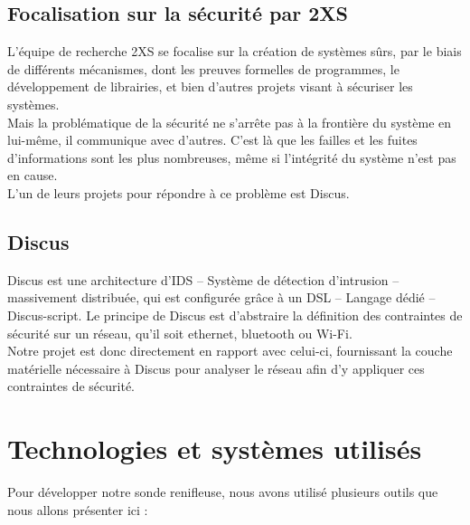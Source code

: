 	\subsection{Focalisation sur la sécurité par 2XS}
		L'équipe de recherche 2XS se focalise sur la création de systèmes sûrs, par le biais de différents mécanismes, dont les preuves formelles de programmes, le développement de librairies, et bien d'autres projets visant à sécuriser les systèmes.\\
		
		Mais la problématique de la sécurité ne s'arrête pas à la frontière du système en lui-même, il communique avec d'autres. C'est là que les failles et les fuites d'informations sont les plus nombreuses, même si l'intégrité du système n'est pas en cause.\\
		L'un de leurs projets pour répondre à ce problème est Discus.
	
	\subsection{Discus}
	Discus est une architecture d'IDS -- Système de détection d'intrusion -- massivement distribuée, qui est configurée grâce à un DSL -- Langage dédié -- Discus-script. Le principe de Discus est d'abstraire la définition des contraintes de sécurité sur un réseau, qu'il soit ethernet, bluetooth ou Wi-Fi.\\
	Notre projet est donc directement en rapport avec celui-ci, fournissant la couche matérielle nécessaire à Discus pour analyser le réseau afin d'y appliquer ces contraintes de sécurité.

\section{Technologies et systèmes utilisés}
	Pour développer notre sonde renifleuse, nous avons utilisé plusieurs outils que nous allons présenter ici :
	
